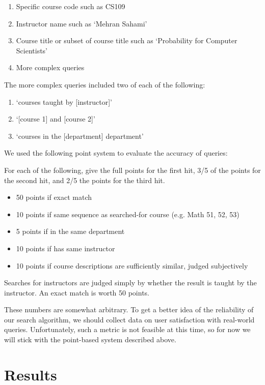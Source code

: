 \documentclass[12pt]{article}
\begin{document}
\begin{enumerate}
\item Specific course code such as CS109
\item Instructor name such as `Mehran Sahami'
\item Course title or subset of course title such as `Probability for Computer Scientists'
\item More complex queries
\end{enumerate}

\noindent The more complex queries included two of each of the following: 

\begin{enumerate}
\item `courses taught by [instructor]'
\item `[course 1] and [course 2]'
\item `courses in the [department] department'
\end{enumerate}

We used the following point system to evaluate the accuracy of queries: 

For each of the following, give the full points for the first hit, 3/5
of the points for the second hit, and 2/5 the points for the third hit.

\begin{itemize}
\item 50 points if exact match
\item 10 points if same sequence as searched-for course (e.g. Math 51,
  52, 53)
\item 5 points if in the same department
\item 10 points if has same instructor
\item 10 points if course descriptions are sufficiently similar, judged subjectively  
\end{itemize}

Searches for instructors are judged simply by whether the result is
taught by the instructor. An exact match is worth 50 points.

These numbers are somewhat arbitrary. To get a better idea of the
reliability of our search algorithm, we should collect data on user
satisfaction with real-world queries. Unfortunately, such a metric is
not feasible at this time, so for now we will stick with the
point-based system described above.

\section*{Results}
	
\end{document}

